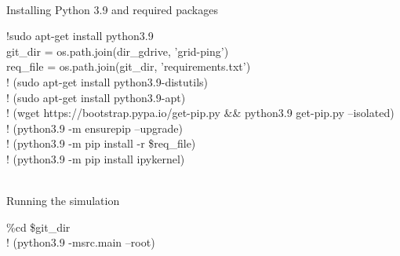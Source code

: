 \vspace{\baselineskip}
\normalhline
\\Installing Python 3.9 and required packages
\normalhline
\vspace{\baselineskip}
{ \codefont \scriptsize \raggedright
    {\color{color-two}!}sudo apt-get install python3.9 \\
    \vspace{\baselineskip}
    git\_dir = os.path.join(dir\_gdrive, {\color{color-one}'grid-ping'}) \\
    req\_file = os.path.join(git\_dir, {\color{color-one}'requirements.txt'}) \\
    {\color{color-two}!} (sudo apt-get install python3.9-distutils) \\
    {\color{color-two}!} (sudo apt-get install python3.9-apt) \\
    {\color{color-two}!} (wget https://bootstrap.pypa.io/get-pip.py \&\& python3.9 get-pip.py --isolated) \\
    {\color{color-two}!} (python3.9 -m ensurepip --upgrade) \\
    {\color{color-two}!} (python3.9 -m pip install -r \$req\_file) \\
    {\color{color-two}!} (python3.9 -m pip install ipykernel) \\
}
\vspace{\baselineskip}
\normalhline
\\Running the simulation
\normalhline
\vspace{\baselineskip}
{ \codefont \scriptsize \raggedright
    {\color{color-two}\%cd} \$git\_dir \\
    {\color{color-two}!} (python3.9 -msrc.main --root) \\
}
\vspace{\baselineskip}
\thickhline